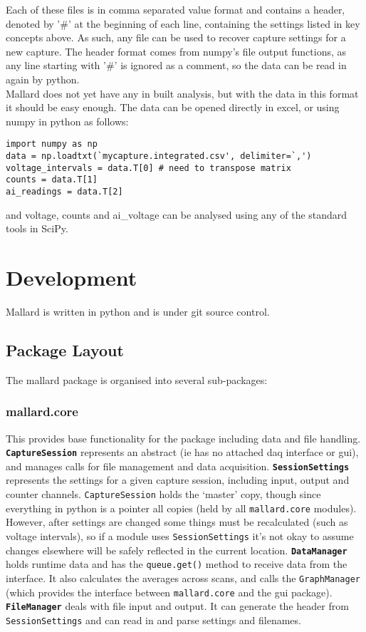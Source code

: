 \documentclass[10pt,a4paper]{article}
\begin{document}
Each of these files is in comma separated value format and contains a header, denoted by '\#' at the beginning of each line, containing the settings listed in key concepts above. As such, any file can be used to recover capture settings for a new capture. The header format comes from numpy's file output functions, as any line starting with '\#' is ignored as a comment, so the data can be read in again by python.\\

Mallard does not yet have any in built analysis, but with the data in this format it should be easy enough. The data can be opened directly in excel, or using numpy in python as follows:

\begin{verbatim}
import numpy as np
data = np.loadtxt(`mycapture.integrated.csv', delimiter=`,')
voltage_intervals = data.T[0] # need to transpose matrix
counts = data.T[1]
ai_readings = data.T[2]
\end{verbatim}

and voltage, counts and  ai\_voltage can be analysed using any of the standard tools in SciPy.


\section{Development}
Mallard is written in python and is under git source control.
\subsection{Package Layout}
The mallard package is organised into several sub-packages:

\subsubsection{mallard.core} 
This provides base functionality for the package including data and file handling. \texttt{\textbf{CaptureSession}} represents an abstract (ie has no attached daq interface or gui), and manages calls for file management and data acquisition. \texttt{\textbf{SessionSettings}} represents the settings for a given capture session, including input, output and counter channels. \texttt{CaptureSession} holds the `master' copy, though since everything in python is a pointer all copies (held by all \texttt{mallard.core} modules). However, after settings are changed some things must be recalculated (such as voltage intervals), so if a module uses \texttt{SessionSettings} it's not okay to assume changes elsewhere will be safely reflected in the current location. \texttt{\textbf{DataManager}} holds runtime data and has the \texttt{queue.get()} method to receive data from the interface. It also calculates the averages across scans, and calls the \texttt{GraphManager} (which provides the interface between \texttt{mallard.core} and the gui package). \texttt\textbf{FileManager} deals with file input and output. It can generate the header from \texttt{SessionSettings} and can read in and parse settings and filenames.
\end{document}
